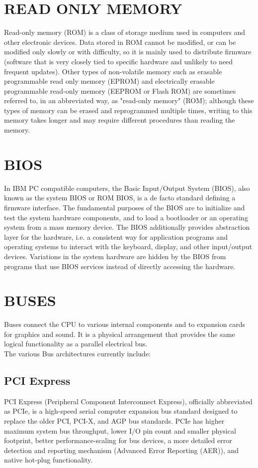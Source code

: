 		\section{READ ONLY MEMORY}
	Read-only memory (ROM) is a class of storage medium used in computers and other electronic devices. Data
	stored in ROM cannot be modified, or can be modified only slowly or with difficulty, so it is mainly used to
	distribute firmware (software that is very closely tied to specific hardware and unlikely to need frequent
	updates). Other types of non-volatile memory such as erasable programmable read only memory (EPROM)
	and electrically erasable programmable read-only memory (EEPROM or Flash ROM) are sometimes referred to,
	in an abbreviated way, as "read-only memory" (ROM); although these types of memory can be erased and reprogrammed
	multiple times, writing to this memory takes longer and may require different procedures than
	reading the memory.
		\section{BIOS}
	In IBM PC compatible computers, the Basic Input/Output System (BIOS), also known as the system
	BIOS or ROM BIOS, is a de facto standard defining a firmware interface. The fundamental purposes of the
	BIOS are to initialize and test the system hardware components, and to load a bootloader or an operating
	system from a mass memory device. The BIOS additionally provides abstraction layer for the hardware, i.e. a
	consistent way for application programs and operating systems to interact with the keyboard, display, and other
	input/output devices. Variations in the system hardware are hidden by the BIOS from programs that use BIOS
	services instead of directly accessing the hardware.
		\section{BUSES}
	Buses connect the CPU to various internal components and to expansion cards for graphics and sound. It is a
	physical arrangement that provides the same logical functionality as a parallel electrical bus.\\
	The various Bus architectures currently include:
			\subsection{PCI Express}
 	PCI Express (Peripheral Component Interconnect Express), officially abbreviated as PCIe, is
	 a high-speed serial computer expansion bus standard designed to replace the older PCI, PCI-X,
	 and AGP bus standards. PCIe has higher maximum system bus throughput, lower I/O pin count and smaller physical 		footprint,
	 better performance-scaling for bus devices, a more detailed error detection and reporting mechanism
	 (Advanced Error Reporting (AER)), and native hot-plug functionality.
